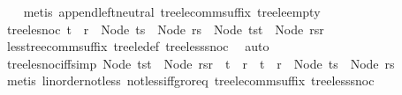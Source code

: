 \begin{isabellebody}
%
\isadelimproof
\ \ %
\endisadelimproof
%
\isatagproof
{}\isamarkupfalse%
\ {\isacharparenleft}{\kern0pt}metis\ append{\isachardot}{\kern0pt}left{\isacharunderscore}{\kern0pt}neutral\ tree{\isacharunderscore}{\kern0pt}le{\isacharunderscore}{\kern0pt}comm{\isacharunderscore}{\kern0pt}suffix\ tree{\isacharunderscore}{\kern0pt}le{\isacharunderscore}{\kern0pt}empty{\isacharparenright}{\kern0pt}%
\endisatagproof
{\isafoldproof}%
%
\isadelimproof
\isanewline
%
\endisadelimproof
\isanewline
{}\isamarkupfalse%
\ tree{\isacharunderscore}{\kern0pt}le{\isacharunderscore}{\kern0pt}snoc{}{\isacharcolon}{\kern0pt}\ {\isachardoublequoteopen}t\ {\isasymle}\ r\ {\isasymLongrightarrow}\ Node\ ts\ {\isasymle}\ Node\ rs\ {\isasymLongrightarrow}\ Node\ {\isacharparenleft}{\kern0pt}ts{\isacharat}{\kern0pt}{\isacharbrackleft}{\kern0pt}t{\isacharbrackright}{\kern0pt}{\isacharparenright}{\kern0pt}\ {\isasymle}\ Node\ {\isacharparenleft}{\kern0pt}rs{\isacharat}{\kern0pt}{\isacharbrackleft}{\kern0pt}r{\isacharbrackright}{\kern0pt}{\isacharparenright}{\kern0pt}{\isachardoublequoteclose}\isanewline
%
\isadelimproof
\ \ %
\endisadelimproof
%
\isatagproof
{}\isamarkupfalse%
\ less{\isacharunderscore}{\kern0pt}tree{\isacharunderscore}{\kern0pt}comm{\isacharunderscore}{\kern0pt}suffix\ tree{\isacharunderscore}{\kern0pt}le{\isacharunderscore}{\kern0pt}def\ tree{\isacharunderscore}{\kern0pt}less{\isacharunderscore}{\kern0pt}snoc{}\ \isamarkupfalse%
\ auto%
\endisatagproof
{\isafoldproof}%
%
\isadelimproof
\isanewline
%
\endisadelimproof
\isanewline
{}\isamarkupfalse%
\ tree{\isacharunderscore}{\kern0pt}le{\isacharunderscore}{\kern0pt}snoc{}{\isacharunderscore}{\kern0pt}iff{\isacharbrackleft}{\kern0pt}simp{\isacharbrackright}{\kern0pt}{\isacharcolon}{\kern0pt}\ {\isachardoublequoteopen}Node\ {\isacharparenleft}{\kern0pt}ts{\isacharat}{\kern0pt}{\isacharbrackleft}{\kern0pt}t{\isacharbrackright}{\kern0pt}{\isacharparenright}{\kern0pt}\ {\isasymle}\ Node\ {\isacharparenleft}{\kern0pt}rs{\isacharat}{\kern0pt}{\isacharbrackleft}{\kern0pt}r{\isacharbrackright}{\kern0pt}{\isacharparenright}{\kern0pt}\ {\isasymlongleftrightarrow}\ t\ {\isacharless}{\kern0pt}\ r\ {\isasymor}\ {\isacharparenleft}{\kern0pt}t\ {\isacharequal}{\kern0pt}\ r\ {\isasymand}\ Node\ ts\ {\isasymle}\ Node\ rs{\isacharparenright}{\kern0pt}{\isachardoublequoteclose}\isanewline
%
\isadelimproof
\ \ %
\endisadelimproof
%
\isatagproof
{}\isamarkupfalse%
\ {\isacharparenleft}{\kern0pt}metis\ linorder{\isacharunderscore}{\kern0pt}not{\isacharunderscore}{\kern0pt}less\ not{\isacharunderscore}{\kern0pt}less{\isacharunderscore}{\kern0pt}iff{\isacharunderscore}{\kern0pt}gr{\isacharunderscore}{\kern0pt}or{\isacharunderscore}{\kern0pt}eq\ tree{\isacharunderscore}{\kern0pt}le{\isacharunderscore}{\kern0pt}comm{\isacharunderscore}{\kern0pt}suffix\ tree{\isacharunderscore}{\kern0pt}less{\isacharunderscore}{\kern0pt}snoc{}{\isacharparenright}{\kern0pt}%

\end{isabellebody}
